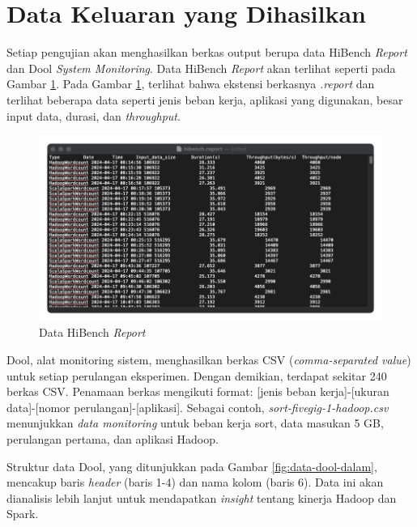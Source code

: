 \section{Data Keluaran yang Dihasilkan}

Setiap pengujian akan menghasilkan berkas output berupa data HiBench \textit{Report} dan Dool \textit{System Monitoring}. Data HiBench \textit{Report} akan terlihat seperti pada Gambar \ref{fig:data-hibench-report}. Pada Gambar \ref{fig:data-hibench-report}, terlihat bahwa ekstensi berkasnya \textit{.report} dan terlihat beberapa data seperti jenis beban kerja, aplikasi yang digunakan, besar input data, durasi, dan \textit{throughput}.

\begin{figure}[h]
    \centering
    \includegraphics[width=1\textwidth]{figures/ch04/data-hibench}
    \caption{Data HiBench \textit{Report}}
    \label{fig:data-hibench-report}
\end{figure}

Dool, alat monitoring sistem, menghasilkan berkas CSV (\textit{comma-separated value}) untuk setiap perulangan eksperimen. Dengan demikian, terdapat sekitar 240 berkas CSV. Penamaan berkas mengikuti format: [jenis beban kerja]-[ukuran data]-[nomor perulangan]-[aplikasi]. Sebagai contoh, \textit{sort-fivegig-1-hadoop.csv} menunjukkan \textit{data monitoring} untuk beban kerja sort, data masukan 5 GB, perulangan pertama, dan aplikasi Hadoop.

Struktur data Dool, yang ditunjukkan pada Gambar \ref{fig:data-dool-dalam}, mencakup baris \textit{header} (baris 1-4) dan nama kolom (baris 6). Data ini akan dianalisis lebih lanjut untuk mendapatkan \textit{insight} tentang kinerja Hadoop dan Spark.

